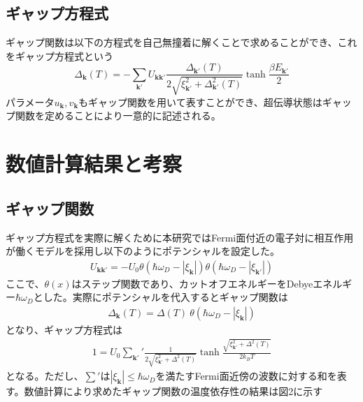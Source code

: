 \documentclass[dvipdfmx, 11pt, twocolumn]{jsarticle}
\begin{document}
\subsection{ギャップ方程式}
    ギャップ関数は以下の方程式を自己無撞着に解くことで求めることができ、これをギャップ方程式という
    \begin{equation}
        \Delta_{\bm{k}}(T) = -\sum_{\bm{k}'} U_{\bm{k}\bm{k}'}  \frac{\Delta_{\bm{k}'}(T)}{2\sqrt{\xi_{\bm{k}'}^2 + \Delta_{\bm{k}'}^2(T)}} \tanh \frac{\beta E_{\bm{k}'}}{2}
    \end{equation}
    パラメータ$u_{\bm{k}},v_{\bm{k}}$もギャップ関数を用いて表すことができ、超伝導状態はギャップ関数を定めることにより一意的に記述される。
\section{数値計算結果と考察}
\subsection{ギャップ関数}
    ギャップ方程式を実際に解くために本研究ではFermi面付近の電子対に相互作用が働くモデルを採用し以下のようにポテンシャルを設定した。
    \begin{align}
        U_{\bm{k}\bm{k}'} = -U_0 \theta(\hbar\omega_D - |\xi_{\bm{k}}|) \theta(\hbar\omega_D - |\xi_{\bm{k}'}|)
    \end{align}
    ここで、$\theta(x)$はステップ関数であり、カットオフエネルギーをDebyeエネルギー$\hbar \omega_D$とした。実際にポテンシャルを代入するとギャップ関数は
    \begin{align}
        \Delta_{\bm{k}}(T) = \Delta(T)\ \theta(\hbar \omega_D - |\xi_{\bm{k}}|)
    \end{align}
    となり、ギャップ方程式は
    \begin{align}
        1  =  U_0{\sum_{\bm{k}'}}'   \frac{1}{2\sqrt{\xi_{\bm{k}'}^2 + \Delta^2(T)}} \tanh \frac{ \sqrt{\xi_{\bm{k}'}^2 + \Delta^2(T)}}{2k_B T} 
    \end{align}
    となる。ただし、$\sum'$は$|\xi_{\bm{k}}|\le \hbar \omega_D$を満たすFermi面近傍の波数に対する和を表す。数値計算により求めたギャップ関数の温度依存性の結果は図2に示す
\end{document}
